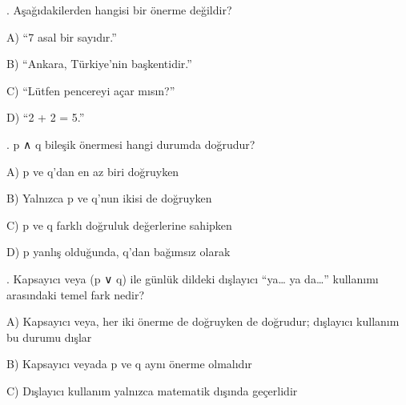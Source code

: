 \par\smallskip{}. Aşağıdakilerden hangisi bir önerme değildir?

\par\noindent\hspace*{1.6em}A) “7 asal bir sayıdır.”

\par\noindent\hspace*{1.6em}B) “Ankara, Türkiye’nin başkentidir.”

\par\noindent\hspace*{1.6em}C) “Lütfen pencereyi açar mısın?”

\par\noindent\hspace*{1.6em}D) “2 + 2 = 5.”

\par\smallskip{}. p ∧ q bileşik önermesi hangi durumda doğrudur?

\par\noindent\hspace*{1.6em}A) p ve q’dan en az biri doğruyken

\par\noindent\hspace*{1.6em}B) Yalnızca p ve q’nun ikisi de doğruyken

\par\noindent\hspace*{1.6em}C) p ve q farklı doğruluk değerlerine sahipken

\par\noindent\hspace*{1.6em}D) p yanlış olduğunda, q’dan bağımsız olarak

\par\smallskip{}. Kapsayıcı veya (p ∨ q) ile günlük dildeki dışlayıcı “ya… ya da…” kullanımı arasındaki temel fark nedir?

\par\noindent\hspace*{1.6em}A) Kapsayıcı veya, her iki önerme de doğruyken de doğrudur; dışlayıcı kullanım bu durumu dışlar

\par\noindent\hspace*{1.6em}B) Kapsayıcı veyada p ve q aynı önerme olmalıdır

\par\noindent\hspace*{1.6em}C) Dışlayıcı kullanım yalnızca matematik dışında geçerlidir

